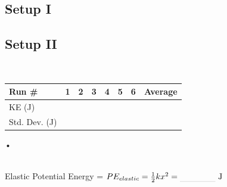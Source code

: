 \documentclass[main.tex]{subfiles}
\begin{document}
\subsection*{Setup I}
\begin{doublespace}

\newpage
\subsection*{Setup II}
\\[3 cm]
\begin{tabular}{|l|@{\hskip 0.75 cm}l|@{\hskip 0.75 cm}l|@{\hskip 0.75 cm}l|@{\hskip 0.75 cm}l|@{\hskip 0.75 cm}l|@{\hskip 0.75 cm}l|@{\hskip 0.75 cm}l|}
\hline
Run \# & 1 & 2 & 3 & 4 & 5 & 6 & Average\\
\hline
KE (J) &&&&&&&\\
\hline
Std. Dev. (J)&&&&&&&\\
\hline
\end{tabular}•

~
\\[1 cm]
Elastic Potential Energy = $PE_{elastic} = \frac{1}{2}kx^2=\rule[-1mm]{1.5cm}{.1pt}\text{ J}$
\end{doublespace}
\end{document}
